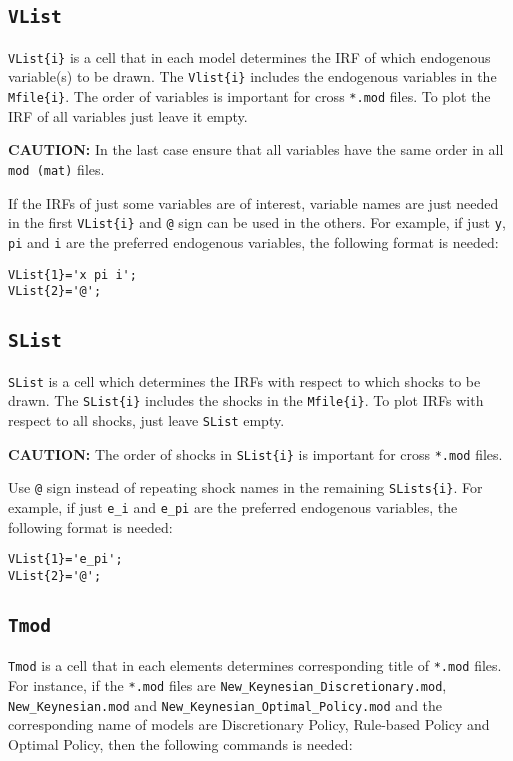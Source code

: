 \documentclass[11pt,a4paper]{article}
\begin{document}
\subsection{\texttt{VList}}
\texttt{VList\{i\}} is a cell that in each model determines the IRF of which endogenous variable(s) to be drawn. The \texttt{Vlist\{i\}} includes the endogenous variables in the \texttt{Mfile\{i\}}. The order of variables is important for cross \texttt{*.mod} files. To plot the IRF of all variables just leave it empty.

{\bf CAUTION:} In the last case ensure that all variables have the same order 
in all \texttt{mod (mat)} files. 

If the IRFs of just some variables are of interest, variable names are just needed in the first \texttt{VList\{i\}} and \texttt{@} sign can be 
used in the others. For example, if just \texttt{y}, \texttt{pi} and \texttt{i} are the preferred 
endogenous variables, the following format is needed:

\begin{lstlisting} 
VList{1}='x pi i'; 
VList{2}='@';
\end{lstlisting}

\subsection{\texttt{SList}}
\texttt{SList} is a cell which determines the IRFs with respect to which shocks to be drawn. The \texttt{SList\{i\}} includes the shocks in the \texttt{Mfile\{i\}}.  To plot IRFs with respect to all shocks, just leave \texttt{SList} empty.

{\bf CAUTION:} The order of shocks in \texttt{SList\{i\}} is important for cross \texttt{*.mod} files.

Use \texttt{@} sign instead of repeating shock names in the remaining \texttt{SLists\{i\}}. For example, if just \texttt{e\_i} and \texttt{e\_pi} are the preferred 
endogenous variables, the following format is needed:

\begin{lstlisting} 
VList{1}='e_pi'; 
VList{2}='@';
\end{lstlisting}


\subsection{\texttt{Tmod}}
\texttt{Tmod} is a cell that in each elements determines corresponding title of \texttt{*.mod} files. For instance, if the \texttt{*.mod} files are \texttt{New_Keynesian_Discretionary.mod}, \texttt{New_Keynesian.mod} and \texttt{New_Keynesian_Optimal_Policy.mod} and the corresponding name of models are Discretionary Policy, Rule-based Policy and Optimal Policy, then the following commands is needed:
    
\end{document}
